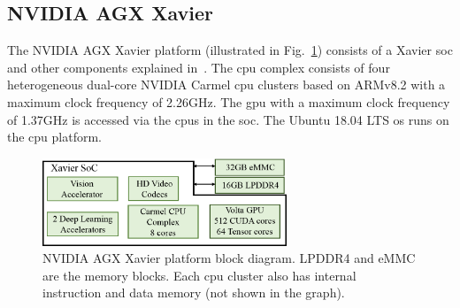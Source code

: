 \subsection{NVIDIA AGX Xavier}
\label{sec:nvidia_agx}
The NVIDIA AGX Xavier platform (illustrated in Fig.~\ref{fig:nvidia_platform}) consists of a Xavier \gls{soc} and other components explained in~\cite{nvidiaAGX}.
The \gls{cpu} complex consists of four heterogeneous dual-core NVIDIA Carmel \gls{cpu} clusters based on ARMv8.2 with a maximum clock frequency of 2.26GHz. 
The \gls{gpu} with a maximum clock frequency of 1.37GHz is accessed via the \glspl{cpu} in the \gls{soc}. The Ubuntu 18.04 LTS \gls{os} runs on the \gls{cpu} platform.
\begin{figure}[t]
\centerline{
    \includegraphics[width=0.65\textwidth]{01_intro/images/platform.png}
    }
    \caption{NVIDIA AGX Xavier platform block diagram. LPDDR4 and eMMC are the memory blocks. Each \gls{cpu} cluster also has internal instruction and data memory (not shown in the graph).}
    \label{fig:nvidia_platform}
\end{figure}